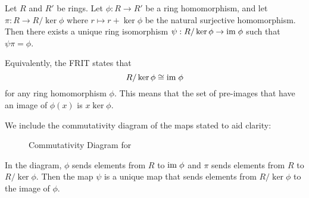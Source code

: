 \newpage

\begin{theorem}\label{thrm-ring-isomorphism-1}
    Let $R$ and $R'$ be rings. Let $\phi: R \to R'$ be a ring homomorphism, and let $\pi: R \to R/\ker\phi$ where $r\mapsto r + \ker\phi$ be the natural surjective homomorphism. Then there exists a unique ring isomorphism $\psi: R / \ker\phi \to \mathrm{im}\;\phi$ such that $\psi\pi = \phi$.
\end{theorem}
\begin{remark}
    Equivalently, the FRIT states that
    \[
        R / \ker\phi \cong \mathrm{im}\;\phi
    \]
    for any ring homomorphism $\phi$. This means that the set of pre-images that have an image of $\phi(x)$ is $x\ker\phi$.
\end{remark}

We include the commutativity diagram of the maps stated to aid clarity:
\begin{figure}[h]
    \centering
    \caption{Commutativity Diagram for }
\end{figure}

In the diagram, $\phi$ sends elements from $R$ to $\mathrm{im}\;\phi$ and $\pi$ sends elements from $R$ to $R/\ker\phi$. Then the map $\psi$ is a unique map that sends elements from $R/\ker\phi$ to the image of $\phi$.

